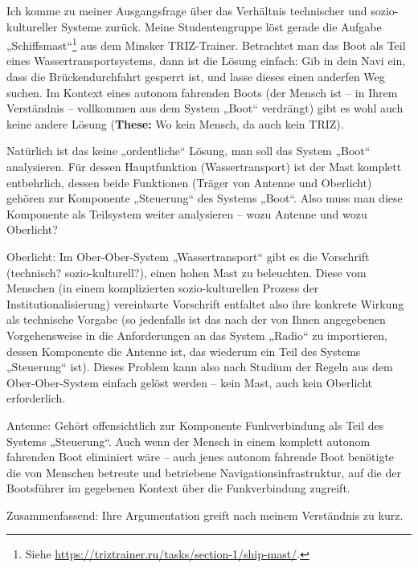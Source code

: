 \documentclass[11pt,a4paper]{article}
\begin{document}
Ich komme zu meiner Ausgangsfrage über das Verhältnis technischer und
sozio-kultureller Systeme zurück. Meine Studentengruppe löst gerade die
Aufgabe „Schiffsmast“\footnote{Siehe
  \url{https://triztrainer.ru/tasks/section-1/ship-mast/}.} aus dem Minsker
TRIZ-Trainer.  Betrachtet man das Boot als Teil eines Wassertransportsystems,
dann ist die Lösung einfach: Gib in dein Navi ein, dass die Brückendurchfahrt
gesperrt ist, und lasse dieses einen anderfen Weg suchen. Im Kontext eines
autonom fahrenden Boots (der Mensch ist -- in Ihrem Verständnis -- vollkommen
aus dem System „Boot“ verdrängt) gibt es wohl auch keine andere Lösung
(\textbf{These:} Wo kein Mensch, da auch kein TRIZ).

Natürlich ist das keine „ordentliche“ Lösung, man soll das System „Boot“
analysieren.  Für dessen Hauptfunktion (Wassertransport) ist der Mast komplett
entbehrlich, dessen beide Funktionen (Träger von Antenne und Oberlicht)
gehören zur Komponente „Steuerung“ des Systems „Boot“. Also muss man diese
Komponente als Teilsystem weiter analysieren -- wozu Antenne und wozu
Oberlicht?

Oberlicht: Im Ober-Ober-System „Wassertransport“ gibt es die Vorschrift
(technisch? sozio-kulturell?), einen hohen Mast zu beleuchten.  Diese vom
Menschen (in einem komplizierten sozio-kulturellen Prozess der
Institutionalisierung) vereinbarte Vorschrift entfaltet also ihre konkrete
Wirkung als technische Vorgabe (so jedenfalls ist das nach der von Ihnen
angegebenen Vorgehensweise in die Anforderungen an das System „Radio“ zu
importieren, dessen Komponente die Antenne ist, das wiederum ein Teil des
Systems „Steuerung“ ist). Dieses Problem kann also nach Studium der Regeln aus
dem Ober-Ober-System einfach gelöst werden -- kein Mast, auch kein Oberlicht
erforderlich.

Antenne: Gehört offensichtlich zur Komponente Funkverbindung als Teil des
Systems „Steuerung“. Auch wenn der Mensch in einem komplett autonom fahrenden
Boot eliminiert wäre -- auch jenes autonom fahrende Boot benötigte die von
Menschen betreute und betriebene Navigationsinfrastruktur, auf die der
Bootsführer im gegebenen Kontext über die Funkverbindung zugreift.

Zusammenfassend: Ihre Argumentation greift nach meinem Verständnis zu kurz. 
\end{document}

